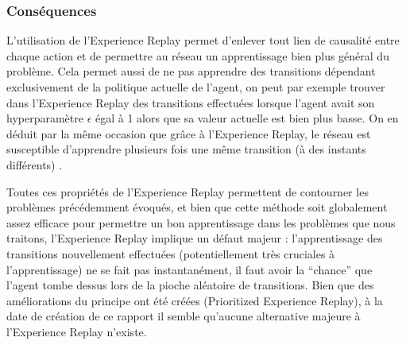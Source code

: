 \subsubsection{Conséquences}
L'utilisation de l'Experience Replay permet d'enlever tout lien de causalité entre chaque action et de permettre au réseau un apprentissage bien plus général du problème. Cela permet aussi de ne pas apprendre des transitions dépendant exclusivement de la politique actuelle de l'agent, on peut par exemple trouver dans l'Experience Replay des transitions effectuées lorsque l'agent avait son hyperparamètre $\epsilon$ égal à 1 alors que sa valeur actuelle est bien plus basse. On en déduit par la même occasion que grâce à l'Experience Replay, le réseau est susceptible d'apprendre plusieurs fois une même transition (à des instants différents) \cite{atari_drl}.
\par
Toutes ces propriétés de l'Experience Replay permettent de contourner les problèmes précédemment évoqués, et bien que cette méthode soit globalement assez efficace pour permettre un bon apprentissage dans les problèmes que nous traitons, l'Experience Replay implique un défaut majeur : l'apprentissage des transitions nouvellement effectuées (potentiellement très cruciales à l'apprentissage) ne se fait pas instantanément, il faut avoir la ``chance'' que l'agent tombe dessus lors de la pioche aléatoire de transitions. Bien que des améliorations du principe ont été créées (Prioritized Experience Replay), à la date de création de ce rapport il semble qu'aucune alternative majeure à l'Experience Replay n'existe.

